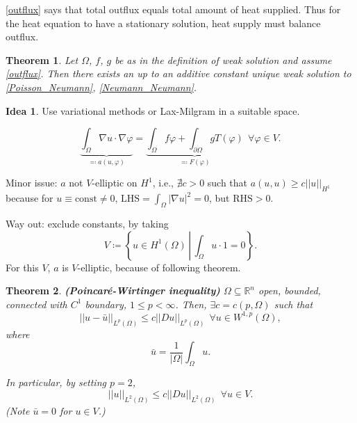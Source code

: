 \documentclass[12pt]{article}
\newtheorem{theorem}{Theorem}[section]
\theoremstyle{definition}
\newtheorem*{idea}{Idea}
\begin{document}
\eqref{outflux} says that total outflux equals total amount of heat supplied. Thus for the heat equation to have a stationary solution, heat supply must balance outflux.

\begin{theorem}\label{Neumann_existence}
Let $\Omega$, $f$, $g$ be as in the definition of weak solution and assume \eqref{outflux}. Then there exists an up to an additive constant unique weak solution to \eqref{Poisson_Neumann}, \eqref{Neumann_Neumann}.
\end{theorem}

\begin{idea}
Use variational methods or Lax-Milgram in a suitable space.
\end{idea}
\[\underbrace{\int_\Omega\nabla u\cdot\nabla\varphi}_{\eqqcolon a(u,\varphi)}=\underbrace{\int_\Omega f\varphi+\int_{\partial\Omega}gT(\varphi)}_{\eqqcolon F(\varphi)}\ \ \forall\varphi\in V.\]

Minor issue: $a$ not $V$-elliptic on $H^1$, i.e., $\nexists c>0$ such that $a(u,u)\geq c||u||_{H^1}$ because for $u\equiv\text{const}\neq0$, $\text{LHS}=\int_\Omega|\nabla u|^2=0$, but $\text{RHS}>0$.

Way out: exclude constants, by taking
\begin{equation}\tag{$**$}\label{exclude_constants}
V\coloneqq\left\{u\in H^1(\Omega)\,\left|\,\int_\Omega u\cdot1=0\right.\right\}.
\end{equation}
For this $V$, $a$ is $V$-elliptic, because of following theorem.

\begin{theorem}
\emph{\textbf{(Poincar\'e-Wirtinger inequality)}} $\Omega\subseteq\mathbb R^n$ open, bounded, connected with $C^1$ boundary, $1\leq p<\infty$. Then, $\exists c=c(p,\Omega)$ such that
\[||u-\bar u||_{L^p(\Omega)}\leq c||Du||_{L^p(\Omega)}\ \ \forall u\in W^{1,p}(\Omega),\]
where
\[\bar u=\frac1{|\Omega|}\int_\Omega u.\]

In particular, by setting $p=2$,
\[||u||_{L^2(\Omega)}\leq c||Du||_{L^2(\Omega)}\ \ \forall u\in V.\]
(Note $\bar u=0$ for $u\in V$.)
\end{theorem}
\end{document}

